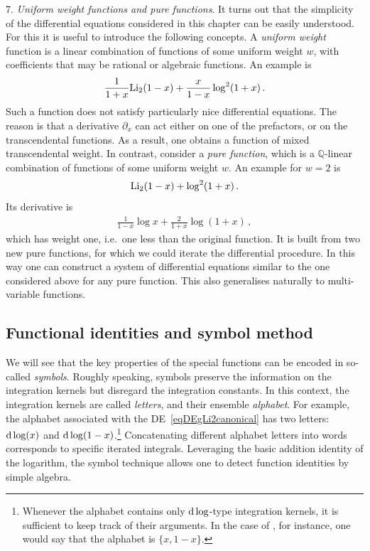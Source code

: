  7. {\it Uniform weight functions and pure functions}.
 It turns out that the simplicity of the differential equations considered in this chapter can be easily understood. For this it is useful to introduce the following concepts. A {\it uniform weight} function is a linear combination of functions of some uniform weight $w$, with coefficients that may be rational or algebraic functions. An example is 
 \begin{align}
  \frac{1}{1+x} {\rm Li}_{2}(1-x)  + \frac{x}{1-x} \log^2(1+ x) \,.
 \end{align}
 Such a function does not satisfy particularly nice differential equations. The reason is that a derivative $\partial_x$ can act either on one of the prefactors, or on the transcendental functions. As a result, one obtains a function of mixed transcendental weight. In contrast, consider a {\it pure function}, which is a ${\mathbb Q}$-linear combination of functions of some uniform weight $w$. An example for $w=2$ is
 \begin{align}
 {\rm Li}_{2}(1-x)  +  \log^2(1+ x) \,.
 \end{align} 
 Its derivative is
 \begin{align}
 \frac{1}{1-x} \log x + \frac{2}{1+x} \log(1+x) \,,
 \end{align}
 which has weight one, i.e.\ one less than the original function.
It is built from two new pure functions, for which we could iterate the differential procedure. In this way one can construct a system of differential equations similar to the one considered above for any pure function. This also generalises naturally to multi-variable functions.
 

 




\subsection{Functional identities and symbol method}
 \label{sec:functionalidentitiesandsymbolmethod}
 
We will see that the key properties of the special functions can be encoded in so-called {\it symbols}. Roughly speaking, symbols preserve the information on the integration kernels but disregard the integration constants. 
In this context, the integration kernels are called \emph{letters}, and their ensemble \emph{alphabet}. 
For example, the alphabet associated with the DE~\eqref{eqDEgLi2canonical} has two letters: $\mathrm{d} \log(x)$ and $\mathrm{d} \log(1-x)$.\footnote{Whenever the alphabet contains only $\mathrm{d} \log$-type integration kernels, it is sufficient to keep track of their arguments. In the case of , for instance, one would say that the alphabet is $\{x,1-x\}$.}
Concatenating different alphabet letters into words corresponds to specific iterated integrals. Leveraging the basic addition identity of the logarithm, the symbol technique allows one to detect function identities by simple algebra. 

